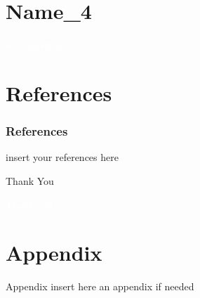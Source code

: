 \documentclass{beamer}
\begin{document}
\section{Name\_4}
\begingroup
{
\begin{frame}[c]
\vfill
\begin{center}
\Large\textcolor{white}{Key question}
\end{center}
\vfill
\end{frame}
}
\endgroup


\section{References}
\begin{frame}[allowframebreaks]
\frametitle{References}\scriptsize

insert your references here


\end{frame}

\begin{frame}
\Huge{\centerline{Thank You}}
\end{frame}

\begingroup
{
\begin{frame}[c]
\vfill
\begin{center}
\Large\textcolor{white}{Thank you}
\end{center}
\vfill
\end{frame}
} 

\endgroup


\section{Appendix}
\begin{frame}{Appendix}
    insert here an appendix if needed
\end{frame}
\end{document}
